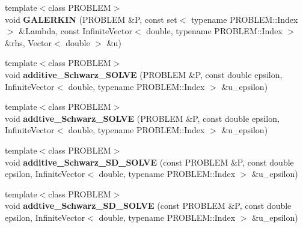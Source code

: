 \begin{CompactItemize}
\item 
\hypertarget{namespaceFrameTL_c081a164d56c41204ca6981f3eca36a7}{
{\footnotesize template$<$class PROBLEM$>$ }\\void \textbf{GALERKIN} (PROBLEM \&P, const set$<$ typename PROBLEM::Index $>$ \&Lambda, const InfiniteVector$<$ double, typename PROBLEM::Index $>$ \&rhs, Vector$<$ double $>$ \&u)}
\label{namespaceFrameTL_c081a164d56c41204ca6981f3eca36a7}

\item 
\hypertarget{namespaceFrameTL_a4b0c696b6cd000adf04b5fb5c484a04}{
{\footnotesize template$<$class PROBLEM$>$ }\\void \textbf{additive\_\-Schwarz\_\-SOLVE} (PROBLEM \&P, const double epsilon, InfiniteVector$<$ double, typename PROBLEM::Index $>$ \&u\_\-epsilon)}
\label{namespaceFrameTL_a4b0c696b6cd000adf04b5fb5c484a04}

\item 
\hypertarget{namespaceFrameTL_affbbbc817346e4a1c801ff4f2f38f5d}{
{\footnotesize template$<$class PROBLEM$>$ }\\void \textbf{addtive\_\-Schwarz\_\-SOLVE} (PROBLEM \&P, const double epsilon, InfiniteVector$<$ double, typename PROBLEM::Index $>$ \&u\_\-epsilon)}
\label{namespaceFrameTL_affbbbc817346e4a1c801ff4f2f38f5d}

\item 
\hypertarget{namespaceFrameTL_6ea4f0fd019efd168c07f7dd5a6aca4c}{
{\footnotesize template$<$class PROBLEM$>$ }\\void \textbf{additive\_\-Schwarz\_\-SD\_\-SOLVE} (const PROBLEM \&P, const double epsilon, InfiniteVector$<$ double, typename PROBLEM::Index $>$ \&u\_\-epsilon)}
\label{namespaceFrameTL_6ea4f0fd019efd168c07f7dd5a6aca4c}

\item 
\hypertarget{namespaceFrameTL_0f8abfca6433dce3a533205aca27803c}{
{\footnotesize template$<$class PROBLEM$>$ }\\void \textbf{addtive\_\-Schwarz\_\-SD\_\-SOLVE} (const PROBLEM \&P, const double epsilon, InfiniteVector$<$ double, typename PROBLEM::Index $>$ \&u\_\-epsilon)}
\label{namespaceFrameTL_0f8abfca6433dce3a533205aca27803c}


\end{CompactItemize}
